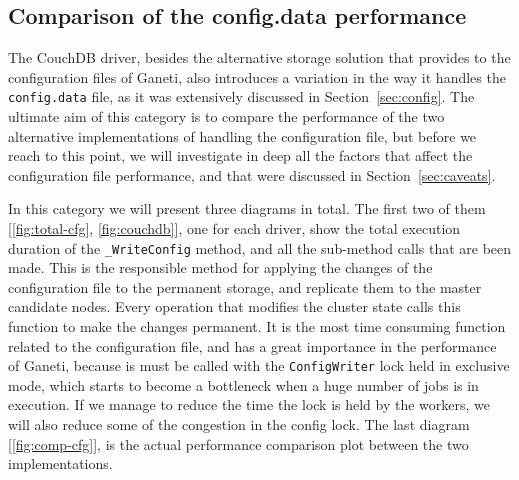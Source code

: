 \subsection{Comparison of the config.data performance}\label{subsec:config_perf}

The CouchDB driver, besides the alternative storage solution that provides to
the configuration files of Ganeti, also introduces a variation in the
way it handles the \texttt{config.data} file, as it was extensively discussed
in Section~\ref{sec:config}. The ultimate aim of this category is to compare the
performance of the two alternative implementations of handling the configuration
file, but before we reach to this point, we will investigate in deep all the
factors that affect the configuration file performance, and that were discussed
in Section~\ref{sec:caveats}.

In this category we will present three diagrams in total. The first two
of them [\ref{fig:total-cfg}, \ref{fig:couchdb}], one for each driver,
show the total execution duration of the \texttt{\_WriteConfig} method, and all
the sub-method calls that are been made. This is the responsible method for
applying the changes of the configuration file to the permanent storage, and
replicate them to the master candidate nodes.
Every operation that modifies the cluster state calls this function to
make the changes permanent. It is the most time consuming function related to
the configuration file, and has a great importance in the performance of Ganeti,
because is must be called with the \texttt{ConfigWriter} lock held in exclusive
mode, which starts to become a bottleneck when a huge number of jobs is in
execution. If we manage to reduce the time the lock is held by the workers, we
will also reduce some of the congestion in the config lock. The last diagram
[\ref{fig:comp-cfg}], is the actual performance comparison plot between the two
implementations.

